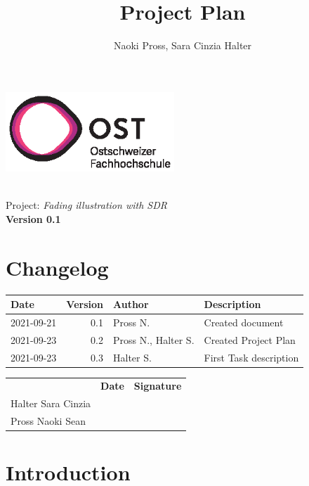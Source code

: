 \documentclass[a4paper, twosided, 11pt]{scrartcl}
\title{Project Plan}
\author{Naoki Pross, Sara Cinzia Halter}
\begin{document}
\begin{titlepage}
	\includegraphics[height=3cm]{fig/ost-logo}
	\begin{flushright}
		\vspace{5cm}
		{\Huge \bfseries \thetitle} \\
		\vspace{5mm}
		{\LARGE Project: \textit{Fading illustration with SDR}} \\
		\vspace{5mm}
		{\LARGE \bfseries Version 0.1}
	\end{flushright}
\end{titlepage}

\section*{Changelog}
\begin{tabularx}{\textwidth}{lrlX}
	\toprule
	\bfseries Date & \bfseries Version & \bfseries Author & \bfseries Description \\
	\midrule
	2021-09-21 & 0.1 & Pross N.            & Created document       \\
	2021-09-23 & 0.2 & Pross N., Halter S. & Created Project Plan   \\
	2021-09-23 & 0.3 & Halter S.           & First Task description \\
	\bottomrule
\end{tabularx}

\vfill
{
	\renewcommand{\arraystretch}{2}
	\begin{tabularx}{\textwidth}{lp{}X}
		                   & \bfseries Date & \bfseries Signature\\
		Halter Sara Cinzia & \hrulefill & \hrulefill \\
		Pross Naoki Sean   & \hrulefill & \hrulefill \\
	\end{tabularx}
}

\clearpage
\tableofcontents
\listoffigures
\listoftables
\clearpage

\section{Introduction}
\end{document}
